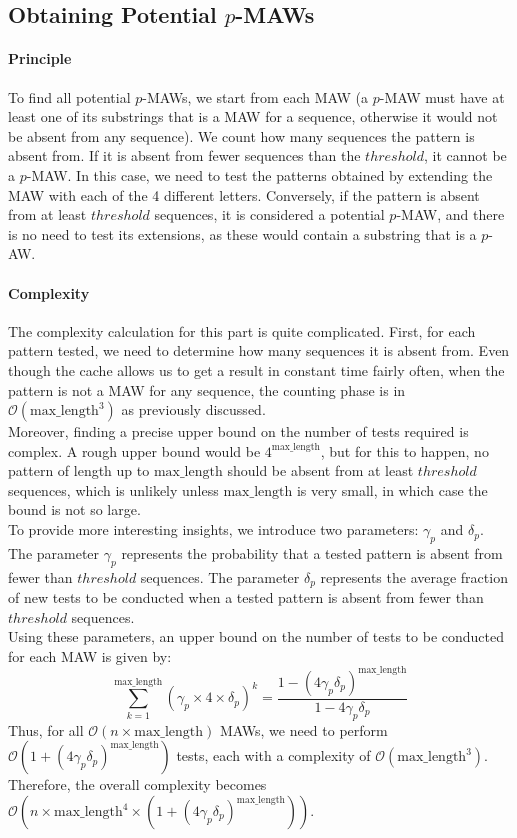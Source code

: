 \documentclass[conference]{IEEEtran}
\begin{document}
\subsection{Obtaining Potential $p$-MAWs}
\paragraph{Principle}
To find all potential $p$-MAWs, we start from each MAW (a $p$-MAW must have at least one of its substrings that is a MAW for a sequence, otherwise it would not be absent from any sequence). We count how many sequences the pattern is absent from. If it is absent from fewer sequences than the $threshold$, it cannot be a $p$-MAW. In this case, we need to test the patterns obtained by extending the MAW with each of the 4 different letters. Conversely, if the pattern is absent from at least $threshold$ sequences, it is considered a potential $p$-MAW, and there is no need to test its extensions, as these would contain a substring that is a $p$-AW.

\paragraph{Complexity}
The complexity calculation for this part is quite complicated. First, for each pattern tested, we need to determine how many sequences it is absent from. Even though the cache allows us to get a result in constant time fairly often, when the pattern is not a MAW for any sequence, the counting phase is in $\mathcal{O}(\text{max\_length}^3)$ as previously discussed.\\
Moreover, finding a precise upper bound on the number of tests required is complex. A rough upper bound would be $4^{\text{max\_length}}$, but for this to happen, no pattern of length up to $\text{max\_length}$ should be absent from at least $threshold$ sequences, which is unlikely unless $\text{max\_length}$ is very small, in which case the bound is not so large.\\
To provide more interesting insights, we introduce two parameters: $\gamma_p$ and $\delta_p$. The parameter $\gamma_p$ represents the probability that a tested pattern is absent from fewer than $threshold$ sequences. The parameter $\delta_p$ represents the average fraction of new tests to be conducted when a tested pattern is absent from fewer than $threshold$ sequences.\\
Using these parameters, an upper bound on the number of tests to be conducted for each MAW is given by:
$$\sum_{k=1}^{\text{max\_length}}(\gamma_p \times 4 \times \delta_p)^k = \dfrac{1 - (4\gamma_p \delta_p)^{\text{max\_length}}}{1 - 4\gamma_p \delta_p}$$
Thus, for all $\mathcal{O}(n \times \text{max\_length})$ MAWs, we need to perform $\mathcal{O}(1 + (4\gamma_p \delta_p)^{\text{max\_length}})$ tests, each with a complexity of $\mathcal{O}(\text{max\_length}^3)$. Therefore, the overall complexity becomes $\mathcal{O}(n \times \text{max\_length}^4 \times (1 + (4\gamma_p \delta_p)^{\text{max\_length}}))$.
\end{document}
